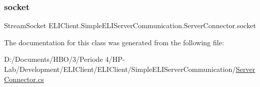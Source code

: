 \subsubsection{\texorpdfstring{socket}{socket}}
{\footnotesize\ttfamily Stream\+Socket E\+L\+I\+Client.\+Simple\+E\+L\+I\+Server\+Communication.\+Server\+Connector.\+socket\hspace{0.3cm}{\ttfamily [private]}}



The documentation for this class was generated from the following file\+:\begin{DoxyCompactItemize}
\item 
D\+:/\+Documents/\+H\+B\+O/3/\+Periode 4/\+H\+P-\/\+Lab/\+Development/\+E\+L\+I\+Client/\+E\+L\+I\+Client/\+Simple\+E\+L\+I\+Server\+Communication/\hyperlink{_server_connector_8cs}{Server\+Connector.\+cs}\end{DoxyCompactItemize}
